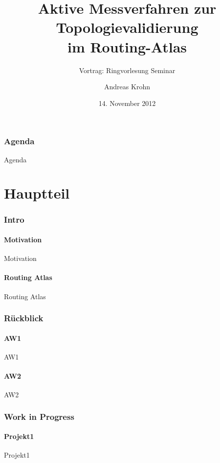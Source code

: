 \documentclass[ngerman,compress,hyperref={bookmarks}]{beamer}
\title[Aktive Messverfahren z. Topologievalidierung]{Aktive Messverfahren zur Topologievalidierung\\ im Routing-Atlas}
\subtitle{Vortrag: Ringvorlesung Seminar}
\author{Andreas Krohn}
\institute[HAW]{Hochschule für Angewandte Wissenschaften Hamburg}
\date[WS 2012/13]{14. November 2012}
\begin{document}
\frame[plain]{\titlepage}

\section*{Agenda}
\begin{frame}{Agenda} \setcounter{tocdepth}{1} \tableofcontents[part=1] \setcounter{tocdepth}{3} \end{frame}

\part{Hauptteil}
\section{Intro}
\subsection{Motivation}
\begin{frame}{Motivation}
\end{frame}

\subsection{Routing Atlas}
\begin{frame}{Routing Atlas}
\end{frame}

\section{Rückblick}
\subsection{AW1}
\begin{frame}{AW1}
\end{frame}

\subsection{AW2}
\begin{frame}{AW2}
\end{frame}

\section{Work in Progress}
\subsection{Projekt1}
\begin{frame}{Projekt1}
\end{frame}
\end{document}
